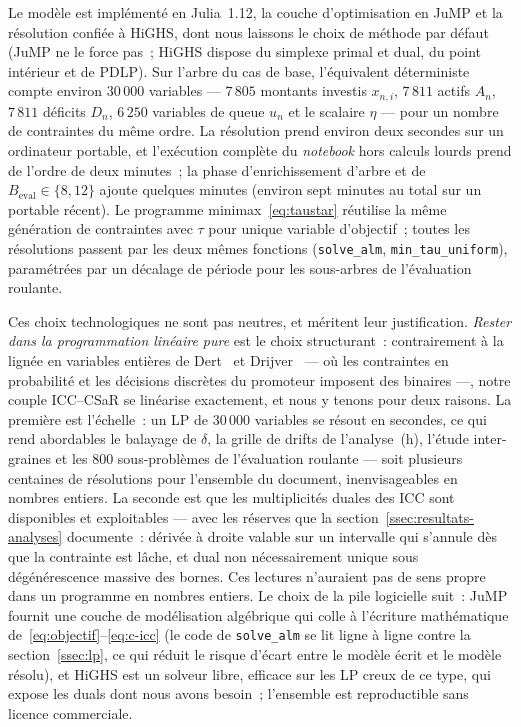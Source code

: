 \documentclass[11pt,letterpaper]{article}
\theoremstyle{definition}
\begin{document}
Le modèle est implémenté en Julia~1.12, la couche d'optimisation en JuMP et la
résolution confiée à HiGHS, dont nous laissons le choix de méthode par défaut
(JuMP ne le force pas~; HiGHS dispose du simplexe primal et dual, du point
intérieur et de PDLP). Sur l'arbre du cas de base,
l'équivalent déterministe compte environ $30\,000$ variables --- $7\,805$
montants investis $x_{n,i}$, $7\,811$ actifs $A_n$, $7\,811$ déficits $D_n$,
$6\,250$ variables de queue $u_n$ et le scalaire $\eta$ --- pour un nombre de
contraintes du même ordre. La résolution prend environ deux secondes sur un
ordinateur portable, et l'exécution complète du \emph{notebook} hors calculs lourds prend de
l'ordre de deux minutes~; la phase d'enrichissement d'arbre et de
$B_{\mathrm{eval}}\in\{8,12\}$ ajoute quelques minutes (environ sept minutes
au total sur un portable récent). Le programme
minimax~\eqref{eq:taustar} réutilise la même génération de contraintes avec
$\tau$ pour unique variable d'objectif~; toutes les résolutions passent par les
deux mêmes fonctions (\texttt{solve\_alm}, \texttt{min\_tau\_uniform}),
paramétrées par un décalage de période pour les sous-arbres de l'évaluation
roulante.

Ces choix technologiques ne sont pas neutres, et méritent leur justification.
\emph{Rester dans la programmation linéaire pure} est le choix structurant~:
contrairement à la lignée en variables entières de Dert~\cite{Dert1995} et
Drijver~\cite{Drijver2005} --- où les contraintes en probabilité et les
décisions discrètes du promoteur imposent des binaires ---, notre couple
ICC--CSaR se linéarise exactement, et nous y tenons pour deux raisons. La
première est l'échelle~: un LP de $30\,000$ variables se résout en secondes,
ce qui rend abordables le balayage de $\delta$, la grille de drifts de
l'analyse~(h), l'étude inter-graines et les $800$ sous-problèmes de
l'évaluation roulante --- soit plusieurs centaines de résolutions pour
l'ensemble du document, inenvisageables en nombres entiers. La seconde est
que les multiplicités duales des ICC sont disponibles et exploitables --- avec
les réserves que la section~\ref{ssec:resultats-analyses} documente~: dérivée à
droite valable sur un intervalle qui s'annule dès que la contrainte est lâche,
et dual non nécessairement unique sous dégénérescence massive des bornes.
Ces lectures n'auraient pas de sens propre dans un programme en nombres entiers. Le
choix de la pile logicielle suit~: JuMP fournit une couche de modélisation
algébrique qui colle à l'écriture mathématique
de~\eqref{eq:objectif}--\eqref{eq:c-icc} (le code de \texttt{solve\_alm} se
lit ligne à ligne contre la section~\ref{ssec:lp}, ce qui réduit le risque
d'écart entre le modèle écrit et le modèle résolu), et HiGHS est un solveur
libre, efficace sur les LP creux de ce type, qui
expose les duals dont nous avons besoin~; l'ensemble est reproductible sans
licence commerciale.
\end{document}
